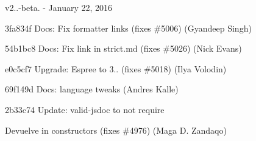 v2..-\/beta. -\/ January 22, 2016


\begin{DoxyItemize}
\item 3fa834f Docs\+: Fix formatter links (fixes \#5006) (Gyandeep Singh)
\item 54b1bc8 Docs\+: Fix link in strict.\+md (fixes \#5026) (Nick Evans)
\item e0c5cf7 Upgrade\+: Espree to 3.. (fixes \#5018) (Ilya Volodin)
\item 69f149d Docs\+: language tweaks (Andres Kalle)
\item 2b33c74 Update\+: valid-\/jsdoc to not require \begin{DoxyReturn}{Devuelve}
in constructors (fixes \#4976) (Maga D. Zandaqo)
\end{DoxyReturn}


\end{DoxyItemize}
